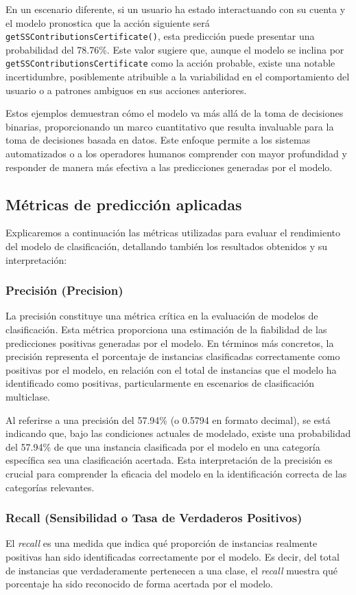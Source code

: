 En un escenario diferente, si un usuario ha estado interactuando con su cuenta y el modelo pronostica que la acción siguiente será \texttt{getSSContributionsCertificate()}, esta predicción puede presentar una probabilidad del 78.76\%. Este valor sugiere que, aunque el modelo se inclina por \texttt{getSSContributionsCertificate} como la acción probable, existe una notable incertidumbre, posiblemente atribuible a la variabilidad en el comportamiento del usuario o a patrones ambiguos en sus acciones anteriores.

Estos ejemplos demuestran cómo el modelo va más allá de la toma de decisiones binarias, proporcionando un marco cuantitativo que resulta invaluable para la toma de decisiones basada en datos. Este enfoque permite a los sistemas automatizados o a los operadores humanos comprender con mayor profundidad y responder de manera más efectiva a las predicciones generadas por el modelo.
\subsection{Métricas de predicción aplicadas}

Explicaremos a continuación las métricas utilizadas para evaluar el rendimiento del modelo de clasificación, detallando también los resultados obtenidos y su interpretación:

\subsubsection{Precisión (Precision)}
La precisión constituye una métrica crítica en la evaluación de modelos de clasificación. Esta métrica proporciona una estimación de la fiabilidad de las predicciones positivas generadas por el modelo. En términos más concretos, la precisión representa el porcentaje de instancias clasificadas correctamente como positivas por el modelo, en relación con el total de instancias que el modelo ha identificado como positivas, particularmente en escenarios de clasificación multiclase.

Al referirse a una precisión del 57.94\% (o 0.5794 en formato decimal), se está indicando que, bajo las condiciones actuales de modelado, existe una probabilidad del 57.94\% de que una instancia clasificada por el modelo en una categoría específica sea una clasificación acertada. Esta interpretación de la precisión es crucial para comprender la eficacia del modelo en la identificación correcta de las categorías relevantes.

\subsubsection{Recall (Sensibilidad o Tasa de Verdaderos Positivos)}
El \textit{recall} es una medida que indica qué proporción de instancias realmente positivas han sido identificadas correctamente por el modelo. Es decir, del total de instancias que verdaderamente pertenecen a una clase, el \textit{recall} muestra qué porcentaje ha sido reconocido de forma acertada por el modelo.

